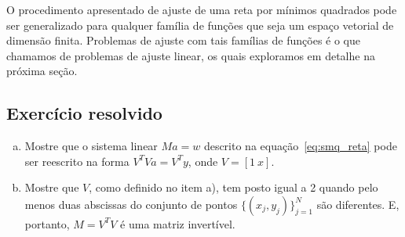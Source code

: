 O procedimento apresentado de ajuste de uma reta por mínimos quadrados pode ser generalizado para qualquer família de funções que seja um espaço vetorial de dimensão finita. Problemas de ajuste com tais famílias de funções é o que chamamos de problemas de ajuste linear, os quais exploramos em detalhe na próxima seção.

\subsection*{Exercício resolvido}

\begin{exeresol}\label{exer:smq_reta}
  \begin{enumerate}[a)]
  \item Mostre que o sistema linear $Ma = w$ descrito na equação~\ref{eq:smq_reta} pode ser reescrito na forma $V^TVa = V^Ty$, onde $V = [1~x]$.
  \item Mostre que $V$, como definido no item a), tem posto igual a 2 quando pelo menos duas abscissas do conjunto de pontos $\{(x_j, y_j)\}_{j=1}^N$ são diferentes. E, portanto, $M = V^TV$ é uma matriz invertível.
  \end{enumerate}
\end{exeresol}
